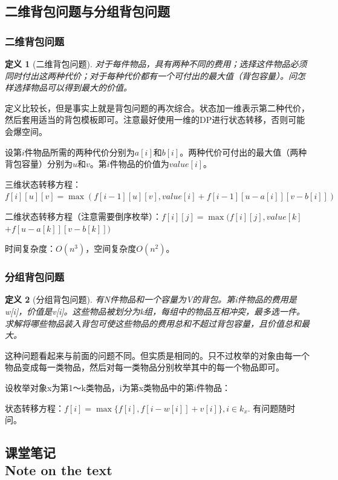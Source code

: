 \documentclass{article}
\newtheorem{definition}{定义}[subsection]
\theoremstyle{nonumberplain}
\newcommand{\note}{\ \par


	\subsection*{课堂笔记\\\tiny{Note on the text}}
	\newpage}
\begin{document}
\subsection{二维背包问题与分组背包问题}
\subsubsection{二维背包问题}
\begin{definition}[二维背包问题]对于每件物品，具有两种不同的费用；选择这件物品必须同时付出这两种代价；对于每种代价都有一个可付出的最大值（背包容量）。问怎样选择物品可以得到最大的价值。\end{definition}

定义比较长，但是事实上就是背包问题的再次综合。状态加一维表示第二种代价，然后套用适当的背包模板即可。注意最好使用一维的DP进行状态转移，否则可能会爆空间。


设第$i$件物品所需的两种代价分别为$a[i]$和$b[i]$。两种代价可付出的最大值（两种背包容量）分别为$u$和$v$。第$i$件物品的价值为$value[i]$。

三维状态转移方程：$f[i][u][v] = \max(f[i-1][u][v] , value[i] + f[i-1][u-a[i]][v-b[i]])$

二维状态转移方程（注意需要倒序枚举）：$f[i][j] = \max(f[i][j] , value[k]$ $+ f[u-a[k]][v-b[k]])$

时间复杂度：$O(n^3)$，空间复杂度$O(n^2)$。

\subsubsection{分组背包问题}
\begin{definition}[分组背包问题]有N件物品和一个容量为V的背包。第i件物品的费用是w[i]，价值是v[i]。这些物品被划分为k组，每组中的物品互相冲突，最多选一件。求解将哪些物品装入背包可使这些物品的费用总和不超过背包容量，且价值总和最大。\end{definition}

这种问题看起来与前面的问题不同。但实质是相同的。只不过枚举的对象由每一个物品变成每一类物品，然后对每一类物品分别枚举其中的每一个物品即可。

设枚举对象x为第1～k类物品，i为第x类物品中的第i件物品：

状态转移方程：$f[i]=\max\{f[i],f[i-w[i]]+v[i]\},i\in k_x.$
有问题随时问。
\note
\end{document}
